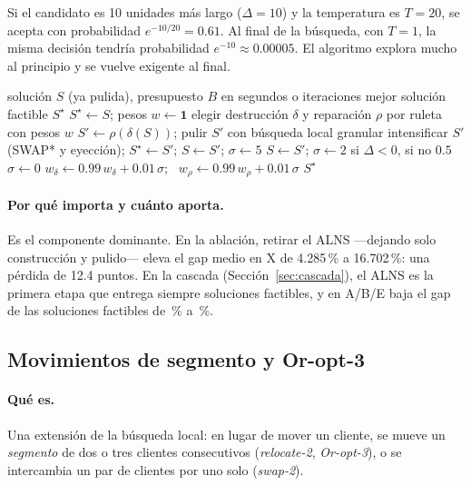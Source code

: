 \documentclass[11pt,a4paper]{article}
\newcommand{\senda}{SENDA}
\begin{document}
\begin{ejemplo}
Si el candidato es 10 unidades más largo ($\Delta=10$) y la temperatura es $T=20$, se acepta con
probabilidad $e^{-10/20}=0.61$. Al final de la búsqueda, con $T=1$, la misma decisión tendría
probabilidad $e^{-10}\approx0.00005$. El algoritmo explora mucho al principio y se vuelve exigente
al final.
\end{ejemplo}

\begin{algorithm}[H]
\caption{Núcleo ALNS de un brazo de \senda}
\label{alg:alns}
\begin{algorithmic}[1]
\Require solución $S$ (ya pulida), presupuesto $B$ en segundos o iteraciones
\Ensure mejor solución factible $S^\star$
\State $S^\star\gets S$; pesos $w\gets\mathbf{1}$
  \State elegir destrucción $\delta$ y reparación $\rho$ por ruleta con pesos $w$
  \State $S'\gets\rho(\delta(S))$; pulir $S'$ con búsqueda local granular
     \State intensificar $S'$ (SWAP* y eyección); $S^\star\gets S'$; $S\gets S'$; $\sigma\gets5$
     \State $S\gets S'$; $\sigma\gets 2$ si $\Delta<0$, si no $0.5$
  \Else
     \State $\sigma\gets0$
  \EndIf
  \State $w_\delta\gets0.99\,w_\delta+0.01\,\sigma$; \ $w_\rho\gets0.99\,w_\rho+0.01\,\sigma$
\EndWhile
\State \Return $S^\star$
\end{algorithmic}
\end{algorithm}

\paragraph{Por qué importa y cuánto aporta.} Es el componente dominante. En la ablación, retirar el
ALNS ---dejando solo construcción y pulido--- eleva el gap medio en X de 4.285\,\% a 16.702\,\%: una
pérdida de 12.4 puntos. En la cascada (Sección~\ref{sec:cascada}), el ALNS es la primera etapa que
entrega siempre soluciones factibles, y en A/B/E baja el gap de las soluciones factibles de
\cgfABEc\,\% a \cgfABEd\,\%.

\subsection{Movimientos de segmento y Or-opt-3}
\label{sec:segmentos}

\paragraph{Qué es.} Una extensión de la búsqueda local: en lugar de mover un cliente, se mueve un
\emph{segmento} de dos o tres clientes consecutivos (\emph{relocate-2}, \emph{Or-opt-3}), o se
intercambia un par de clientes por uno solo (\emph{swap-2}).
\end{document}
